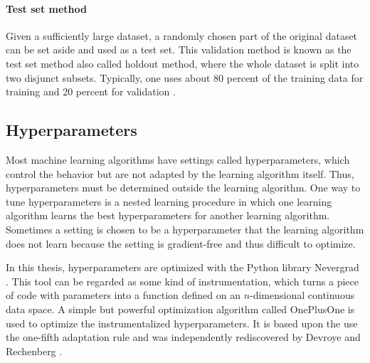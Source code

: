 \documentclass{scrartcl}
\begin{document}
\paragraph{Test set method} 
Given a sufficiently large dataset, a randomly chosen part of the original dataset can be set aside and used as a test set. This validation method is known as the test set method also called holdout method, where the whole dataset is split into two disjunct subsets. Typically, one uses about 80 percent of the training data for training and 20 percent for validation \cite{Goodfellow2016}. 




\subsection{Hyperparameters}

Most machine learning algorithms have settings called hyperparameters, which control the behavior but are not adapted by the learning algorithm itself. Thus, hyperparameters must be determined outside the learning algorithm. One way to tune hyperparameters is a nested learning procedure in which one learning algorithm learns the best hyperparameters for another learning algorithm.  Sometimes a setting is chosen to be a hyperparameter that the learning algorithm does not learn because the setting is gradient-free and thus difficult to optimize.  

In this thesis, hyperparameters are optimized with the Python library Nevergrad \cite{nevergrad}. This tool can be regarded as some kind of instrumentation, which turns a piece of code with parameters into a function defined on an $n$-dimensional continuous data space. A simple but powerful optimization algorithm called OnePlusOne is used to optimize the instrumentalized hyperparameters. It is based upon the use the one-fifth adaptation rule \cite{Schumer1968} and was independently rediscovered by Devroye \cite{Devroye1972} and Rechenberg \cite{Rechenberg1973}.
    
\end{document}
